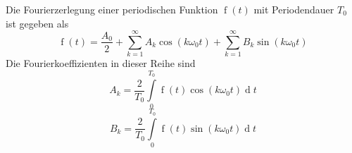 Die Fourierzerlegung einer periodischen Funktion $\operatorname{f}(t)$ mit Periodendauer $T_0$ ist gegeben als
$$\operatorname{f}(t) = \frac{A_0}{2} + \sum\limits_{k=1}^{\infty} A_k \cos(k \omega_0 t) + \sum\limits_{k=1}^{\infty} B_k \sin(k \omega_0 t)$$
Die Fourierkoeffizienten in dieser Reihe sind 
$$A_k = \frac{2}{T_0} \int\limits_0^{T_0} \operatorname{f}(t) \cos(k \omega_0 t) \operatorname{d} t$$
$$B_k = \frac{2}{T_0} \int\limits_0^{T_0} \operatorname{f}(t) \sin(k \omega_0 t) \operatorname{d} t$$

